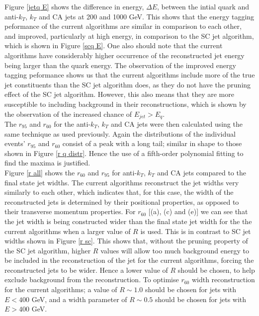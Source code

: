 \documentclass[a4paper,11pt, onecolumn]{article}
\begin{document}
  \newpage Figure \ref{jetq E} shows the difference in energy, $\Delta E$, between the intial quark and anti-$k_{T}$, $k_{T}$ and CA jets 
  at 200 and 1000 GeV. This shows that the energy tagging peformance of the current algorithms are similar in comparison to each other, and 
  improved, particularly at high energy, in comparison to the SC jet algorithm, which is shown in Figure \ref{scq E}. 
  One also should note that the current algorithms have considerably higher occurrence of the reconstructed jet energy being larger than 
  the quark energy. The observation of the improved energy tagging peformance shows us that the current algorithms include more of the true
  jet constituents than the SC jet algorithm does, as they do not have the pruning effect of the SC jet algorithm. However, this also means that they are more susceptible to 
  including background in their reconstructions, which is shown by the observation of the increased chance of $E_{jet} > E_q$. \\

  The $r_{95}$ and $r_{60}$ for the anti-$k_T$, $k_T$ and CA jets were then calculated using the same technique as used previously. Again the
  distributions of the individual events' $r_{95}$ and $r_{60}$ consist of a peak with a long tail; similar in shape to those shown in Figure \ref{r q distr}. Hence the use 
  of a fifth-order polynomial fitting to find the maxima is justified. \\
  

  Figure \ref{r all} shows the $r_{60}$ and $r_{95}$ for anti-$k_{T}$, $k_{T}$ and CA jets compared to the final state jet widths. 
  The current algorithms reconstruct the jet widths very similarly to each other, which indicates
  that, for this case, the width of the reconstructed jets is determined by their positional properties, as opposed to their transverse momentum 
  properties. For $r_{60}$ [(a), (c) and (e)] we can see that the jet width is being constructed wider than the final state jet width for 
  the the current algorithms when a larger value of $R$ is used. This is in contrast to SC jet widths shown in Figure \ref{r sc}. This shows that, without 
  the pruning property of the SC jet algorithm, higher $R$ values will allow too much background energy to be included in the reconstruction of the jet for the current 
  algorithms, forcing the reconstructed jets to be wider.
  Hence a lower value of $R$ should be chosen, to help exclude background from the reconstruction. To optimise $r_{60}$ width reconstruction for the 
  current algorithms; a value of $R \sim 1.0$ should be chosen for jets with $E < 400$ GeV, and a width parameter of $R \sim 0.5$ should be chosen for jets with 
  $E > 400$ GeV. \\
  
\end{document}
